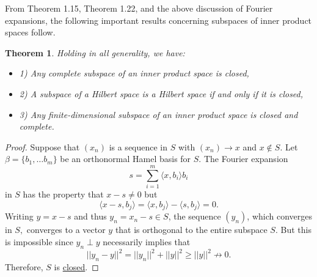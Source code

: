 \documentclass{article}
\newtheorem{thm}{Theorem}[section]
\theoremstyle{definition}
\theoremstyle{remark}
\numberwithin{equation}{section}
\begin{document}
From Theorem 1.15, Theorem 1.22, and the above discussion of Fourier expansions, the following important results concerning subspaces of inner product spaces follow. 

\begin{thm}
Holding in all generality, we have: 
\begin{itemize}
    \item 1) Any complete subspace of an inner product space is closed, 
    \item 2) A subspace of a Hilbert space is a Hilbert space if and only if it is closed, 
    \item 3) Any finite-dimensional subspace of an inner product space is closed and complete. 
\end{itemize}
\end{thm}

\begin{proof}
Suppose that $(x_n)$ is a sequence in $S$ with $(x_n) \rightarrow x$ and $x \not\in S$. Let $\beta =\{ b_1, \dots b_m \}$ be an orthonormal Hamel basis for $S$. The Fourier expansion 
$$s = \sum _{i = 1} ^m \langle x, b_i \rangle b_i $$
in $S$ has the property that $x-s \neq 0$ but 
$$\langle x - s, b_j \rangle = \langle x , b_j \rangle - \langle s, b_j \rangle = 0. $$
Writing $y = x - s$ and thus $y_n = x_n -s \in S$, the sequence $(y_n)$, which converges in $S,$ converges to a vector $y$ that is orthogonal to the entire subspace $S$. But this is impossible since $y_n \perp y$ necessarily implies that 
$$||y_n - y|| ^2 = ||y_n||^2 + ||y||^2 \geq ||y||^2 \not \rightarrow 0.  $$
Therefore, $S$ is \href{https://math.stackexchange.com/questions/1081742/what-is-the-definition-of-closed-subspace}{closed}. 
\end{proof}
\end{document}

